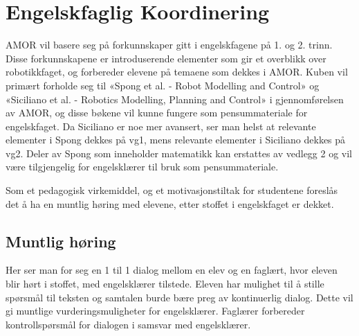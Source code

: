 \section{Engelskfaglig Koordinering} \label{Sec: Engelskfaglig_Koordinering}

AMOR vil basere seg på forkunnskaper gitt i engelskfagene på 1. og 2. trinn.
Disse forkunnskapene er introduserende elementer som gir et overblikk over robotikkfaget, og forbereder elevene på temaene som dekkes i AMOR.
Kuben vil primært forholde seg til «Spong et al. - Robot Modelling and Control» og «Siciliano et al. - Robotics Modelling, Planning and Control» i gjennomførelsen av AMOR, og disse bøkene vil kunne fungere som pensummateriale for engelskfaget.
Da Siciliano er noe mer avansert, ser man helst at relevante elementer i Spong dekkes på vg1, mens relevante elementer i Siciliano dekkes på vg2.
Deler av Spong som inneholder matematikk kan erstattes av vedlegg 2 og vil være tilgjengelig for engelsklærer til bruk som pensummateriale.

Som et pedagogisk virkemiddel, og et motivasjonstiltak for studentene foreslås det å ha en muntlig høring med elevene, etter stoffet i engelskfaget er dekket.

	\subsection{Muntlig høring}
			Her ser man for seg en 1 til 1 dialog mellom en elev og en faglært, hvor eleven blir hørt i stoffet, med engelsklærer tilstede.
			Eleven har mulighet til å stille spørsmål til teksten og samtalen burde bære preg av kontinuerlig dialog. Dette vil gi muntlige vurderingsmuligheter for engelsklærer. Faglærer forbereder kontrollspørsmål for dialogen i samsvar med engelsklærer.
